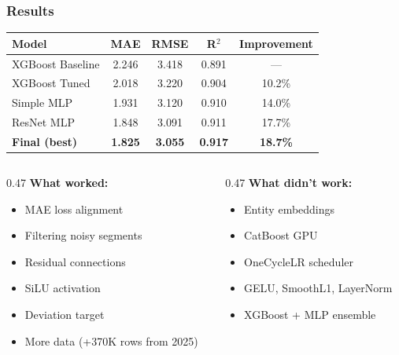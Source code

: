 \documentclass{beamer}
\begin{document}
\begin{frame}
\frametitle{Results}

\centering
{\small
\begin{tabular}{@{}lcccc@{}}
\toprule
\textbf{Model} & \textbf{MAE} & \textbf{RMSE} & \textbf{R$^2$} & \textbf{Improvement} \\
\midrule
XGBoost Baseline & 2.246 & 3.418 & 0.891 & --- \\
XGBoost Tuned    & 2.018 & 3.220 & 0.904 & 10.2\% \\
Simple MLP       & 1.931 & 3.120 & 0.910 & 14.0\% \\
ResNet MLP       & 1.848 & 3.091 & 0.911 & 17.7\% \\
\textbf{Final (best)} & \textbf{1.825} & \textbf{3.055} & \textbf{0.917} & \textbf{18.7\%} \\
\bottomrule
\end{tabular}
}

\bigskip
\begin{columns}[T]
\begin{column}{0.47\textwidth}
\textbf{What worked:}
\begin{itemize}\setlength\itemsep{2pt}
  \item MAE loss alignment
  \item Filtering noisy segments
  \item Residual connections
  \item SiLU activation
  \item Deviation target
  \item More data (+370K rows from 2025)
\end{itemize}
\end{column}
\begin{column}{0.47\textwidth}
\textbf{What didn't work:}
\begin{itemize}\setlength\itemsep{2pt}
  \item Entity embeddings
  \item CatBoost GPU
  \item OneCycleLR scheduler
  \item GELU, SmoothL1, LayerNorm
  \item XGBoost + MLP ensemble
\end{itemize}
\end{column}
\end{columns}
\end{frame}
\end{document}
